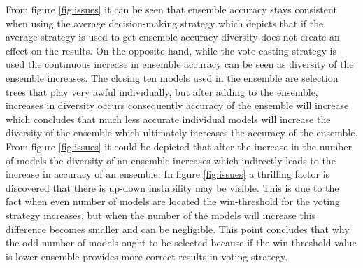 \documentclass[12pt]{article}
\begin{document}
From figure \ref{fig:issues} it can be seen that ensemble accuracy stays consistent when using the average decision-making strategy which depicts that if the average strategy is used to get ensemble accuracy diversity does not create an effect on the results. On the opposite hand, while the vote casting strategy is used the continuous increase in ensemble accuracy can be seen as diversity of the ensemble increases. The closing ten models used in the ensemble are selection trees that play very awful individually, but after adding to the ensemble, increases in diversity occurs consequently accuracy of the ensemble will increase which concludes that much less accurate individual models will increase the diversity of the ensemble which ultimately increases the accuracy of the ensemble. From figure \ref{fig:issues} it could be depicted that after the increase in the number of models the diversity of an ensemble increases which indirectly leads to the increase in accuracy of an ensemble. In figure \ref{fig:issues} a thrilling factor is discovered that there is up-down instability may be visible. This is due to the fact when even number of models are located the win-threshold for the voting strategy increases, but when the number of the models will increase this difference becomes smaller and can be negligible. This point concludes that why the odd number of models ought to be selected because if the win-threshold value is lower ensemble provides more correct results in voting strategy.
\end{document}
